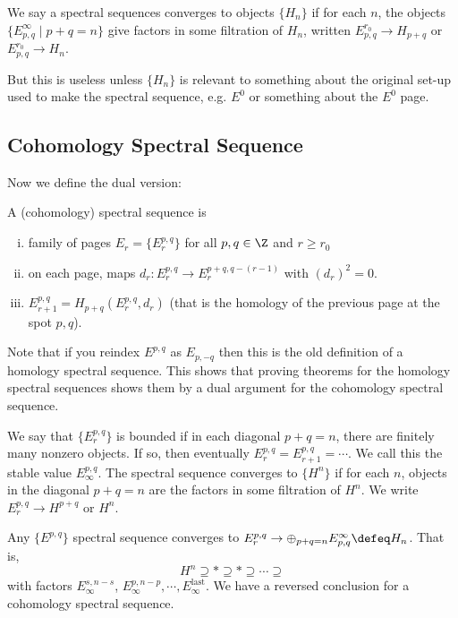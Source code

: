 \begin{dfn}
We say a spectral sequences converges to objects $\{H_n\}$ if for each $n$, the objects $\{E^\infty_{p,q} \;|\; p+q=n\}$ give factors in some filtration of $H_n$, written $E^{r_0}_{p,q} \to H_{p+q}$ or $E^{r_0}_{p,q} \to H_n$.
\end{dfn}

But this is useless unless $\{H_n\}$ is relevant to something about the original set-up used to make the spectral sequence, e.g. $E^0$ or something about the $E^0$ page. 

\subsection{Cohomology Spectral Sequence}

Now we define the dual version:

\begin{dfn}
A (cohomology) spectral sequence is
\begin{enumerate}[(i)]
\item family of pages $E_r=\{E_r^{p,q}\}$ for all $p,q \in \Z$ and $r \geq r_0$
\item on each page, maps $d_r: E_r^{p,q} \to E_r^{p+q,q-(r-1)}$ with $(d_r)^2=0$.
\item $E_{r+1}^{p,q}=H_{p+q}(E_r^{p,q},d_r)$ (that is the homology of the previous page at the spot $p,q$).
\end{enumerate}
\end{dfn}

Note that if you reindex $E^{p,q}$ as $E_{p,-q}$ then this is the old definition of a homology spectral sequence. This shows that proving theorems for the homology spectral sequences shows them by a dual argument for the cohomology spectral sequence. 

\begin{dfn}
We say that $\{E_r^{p,q}\}$ is bounded if in each diagonal $p+q=n$, there are finitely many nonzero objects. If so, then eventually $E_r^{p,q}=E_{r+1}^{p,q}=\cdots$. We call this the stable value $E_\infty^{p,q}$. The spectral sequence converges to $\{H^n\}$ if for each $n$, objects in the diagonal $p+q=n$ are the factors in some filtration of $H^n$. We write $E_r^{p,q} \to H^{p+q}$ or $H^n$.
\end{dfn}

\begin{ex}
Any $\{E^{p,q}\}$ spectral sequence converges to $E^{p,q}_r \to \oplus_{p+q=n} E^\infty_{p,q} \defeq H_n$. That is,
\[
H^n \supseteq * \supseteq * \supseteq \cdots \supseteq 
\]
with factors $E_\infty^{s,n-s}$, $E_\infty^{p,n-p},\cdots, E^{\text{last}}_\infty$. We have a reversed conclusion for a cohomology spectral sequence. 
\end{ex}

